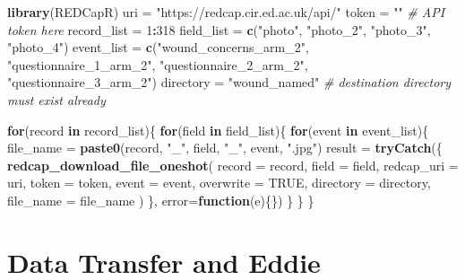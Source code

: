 \documentclass[]{book}
\newenvironment{Shaded}{\begin{snugshade}}{\end{snugshade}}
\newcommand{\CommentTok}[1]{\textcolor[rgb]{0.56,0.35,0.01}{\textit{#1}}}
\newcommand{\ControlFlowTok}[1]{\textcolor[rgb]{0.13,0.29,0.53}{\textbf{#1}}}
\newcommand{\DataTypeTok}[1]{\textcolor[rgb]{0.13,0.29,0.53}{#1}}
\newcommand{\DecValTok}[1]{\textcolor[rgb]{0.00,0.00,0.81}{#1}}
\newcommand{\KeywordTok}[1]{\textcolor[rgb]{0.13,0.29,0.53}{\textbf{#1}}}
\newcommand{\NormalTok}[1]{#1}
\newcommand{\OperatorTok}[1]{\textcolor[rgb]{0.81,0.36,0.00}{\textbf{#1}}}
\newcommand{\OtherTok}[1]{\textcolor[rgb]{0.56,0.35,0.01}{#1}}
\newcommand{\StringTok}[1]{\textcolor[rgb]{0.31,0.60,0.02}{#1}}
\begin{document}
\begin{Shaded}
\begin{Highlighting}[]
\KeywordTok{library}\NormalTok{(REDCapR)}
\NormalTok{uri =}\StringTok{ "https://redcap.cir.ed.ac.uk/api/"}
\NormalTok{token =}\StringTok{ ""} \CommentTok{# API token here}
\NormalTok{record_list =}\StringTok{ }\DecValTok{1}\OperatorTok{:}\DecValTok{318}
\NormalTok{field_list =}\StringTok{ }\KeywordTok{c}\NormalTok{(}\StringTok{"photo"}\NormalTok{, }\StringTok{"photo_2"}\NormalTok{, }\StringTok{"photo_3"}\NormalTok{, }\StringTok{"photo_4"}\NormalTok{)}
\NormalTok{event_list =}\StringTok{ }\KeywordTok{c}\NormalTok{(}\StringTok{"wound_concerns_arm_2"}\NormalTok{, }\StringTok{"questionnaire_1_arm_2"}\NormalTok{,}
               \StringTok{"questionnaire_2_arm_2"}\NormalTok{, }\StringTok{"questionnaire_3_arm_2"}\NormalTok{)}
\NormalTok{directory =}\StringTok{ "wound_named"} \CommentTok{# destination directory must exist already}

\ControlFlowTok{for}\NormalTok{(record }\ControlFlowTok{in}\NormalTok{ record_list)\{}
  \ControlFlowTok{for}\NormalTok{(field }\ControlFlowTok{in}\NormalTok{ field_list)\{}
    \ControlFlowTok{for}\NormalTok{(event }\ControlFlowTok{in}\NormalTok{ event_list)\{}
\NormalTok{      file_name =}\StringTok{ }\KeywordTok{paste0}\NormalTok{(record, }\StringTok{"_"}\NormalTok{, field, }\StringTok{"_"}\NormalTok{, event, }\StringTok{".jpg"}\NormalTok{)}
\NormalTok{      result =}\StringTok{ }
\StringTok{        }\KeywordTok{tryCatch}\NormalTok{(\{}
          \KeywordTok{redcap_download_file_oneshot}\NormalTok{(}
            \DataTypeTok{record        =}\NormalTok{ record,}
            \DataTypeTok{field         =}\NormalTok{ field,}
            \DataTypeTok{redcap_uri    =}\NormalTok{ uri,}
            \DataTypeTok{token         =}\NormalTok{ token,}
            \DataTypeTok{event         =}\NormalTok{ event,}
            \DataTypeTok{overwrite     =} \OtherTok{TRUE}\NormalTok{,}
            \DataTypeTok{directory     =}\NormalTok{ directory,}
            \DataTypeTok{file_name     =}\NormalTok{ file_name}
\NormalTok{          )}
\NormalTok{        \}, }\DataTypeTok{error=}\ControlFlowTok{function}\NormalTok{(e)\{\})}
\NormalTok{    \}}
\NormalTok{  \}}
\NormalTok{\}}
\end{Highlighting}
\end{Shaded}

\hypertarget{data-transfer-and-eddie}{%
\chapter{Data Transfer and Eddie}\label{data-transfer-and-eddie}}
\end{document}
